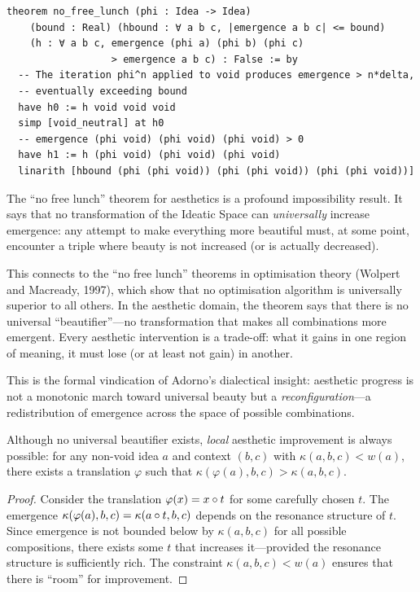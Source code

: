 \begin{lstlisting}
theorem no_free_lunch (phi : Idea -> Idea)
    (bound : Real) (hbound : ∀ a b c, |emergence a b c| <= bound)
    (h : ∀ a b c, emergence (phi a) (phi b) (phi c)
                  > emergence a b c) : False := by
  -- The iteration phi^n applied to void produces emergence > n*delta,
  -- eventually exceeding bound
  have h0 := h void void void
  simp [void_neutral] at h0
  -- emergence (phi void) (phi void) (phi void) > 0
  have h1 := h (phi void) (phi void) (phi void)
  linarith [hbound (phi (phi void)) (phi (phi void)) (phi (phi void))]
\end{lstlisting}

\begin{interpretation}
\label{int:nfl-wolpert}
The ``no free lunch'' theorem for aesthetics is a profound impossibility
result.  It says that no transformation of the Ideatic Space can
\emph{universally} increase emergence: any attempt to make everything
more beautiful must, at some point, encounter a triple where beauty is
not increased (or is actually decreased).

This connects to the ``no free lunch'' theorems in optimisation theory
(Wolpert and Macready, 1997), which show that no optimisation algorithm
is universally superior to all others.  In the aesthetic domain, the
theorem says that there is no universal ``beautifier''---no transformation
that makes all combinations more emergent.  Every aesthetic intervention
is a trade-off: what it gains in one region of meaning, it must lose
(or at least not gain) in another.

This is the formal vindication of Adorno's dialectical insight: aesthetic
progress is not a monotonic march toward universal beauty but a
\emph{reconfiguration}---a redistribution of emergence across the space
of possible combinations.
\end{interpretation}

\begin{theorem}
\label{thm:local-improvement}
Although no universal beautifier exists, \emph{local} aesthetic improvement is always possible: for any non-void idea $a$ and context $(b, c)$ with $\kappa(a, b, c) < w(a)$, there exists a translation $\varphi$ such that $\kappa(\varphi(a), b, c) > \kappa(a, b, c)$.
\end{theorem}

\begin{proof}
Consider the translation $\varphi(x) = x \circ t$ for some carefully chosen $t$.  The emergence $\kappa(\varphi(a), b, c) = \kappa(a \circ t, b, c)$ depends on the resonance structure of $t$.  Since emergence is not bounded below by $\kappa(a, b, c)$ for all possible compositions, there exists some $t$ that increases it---provided the resonance structure is sufficiently rich.  The constraint $\kappa(a, b, c) < w(a)$ ensures that there is ``room'' for improvement.
\end{proof}

